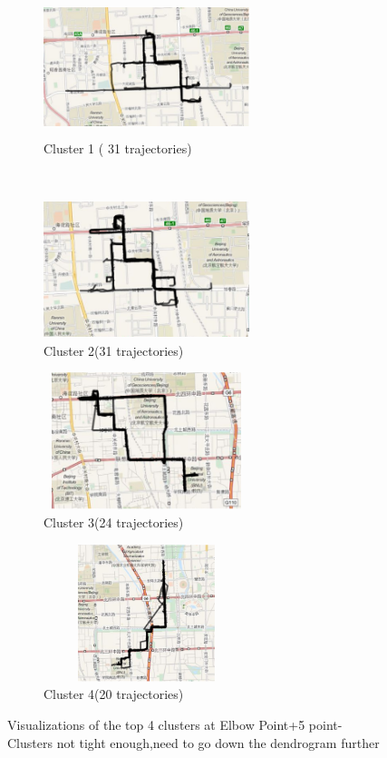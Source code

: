 \begin{figure}
    \centering
    \begin{subfigure}[t]{.5\textwidth}
        \centering
        \includegraphics[width=6cm,height=4cm,keepaspectratio]{figs/new/Elbow5_Cluster1.eps}
        \caption{Cluster 1 ( 31 trajectories)}
    \end{subfigure}%
    ~ 
    \begin{subfigure}[t]{.5\textwidth}
        \centering
        \includegraphics[width=6cm,height=4cm,keepaspectratio]{figs/new/Elbow5_Cluster2.eps}
        \caption{Cluster 2(31 trajectories)}
    \end{subfigure}
    
    \begin{subfigure}[t]{.5\textwidth}
        \centering
        \includegraphics[width=6cm,height=4cm,keepaspectratio]{figs/new/Elbow5_Cluster3.eps}
        \caption{Cluster 3(24 trajectories)}
    \end{subfigure}%
    \begin{subfigure}[t]{.5\textwidth}
        \centering
        \includegraphics[width=6cm,height=4cm,keepaspectratio]{figs/new/Elbow5_Cluster4.eps}
        \caption{Cluster 4(20 trajectories)}
    \end{subfigure}
    \caption{Visualizations of the top 4 clusters at Elbow Point+5 point- Clusters not tight enough,need to go down the dendrogram further}
    \label{fig:elbow5visual}
\end{figure}
